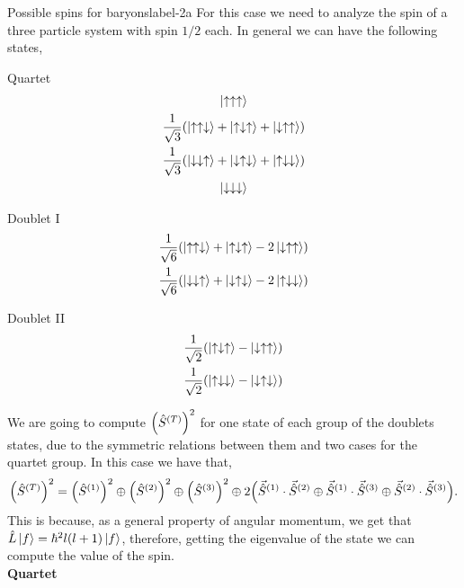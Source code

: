 \documentclass[../main.tex]{subfiles}
\begin{document}
\begin{sol}{Possible spins for baryons}{label-2a}
    For this case we need to analyze the spin of a three particle system with spin $1/2$ each.
    In general we can have the following states,

    \begin{minipage}[c]{0.3\textwidth}
        \centering
        Quartet
    \begin{gather*}
        \ket{\uparrow\uparrow\uparrow} \\
        \frac{1}{\sqrt{3}}\qty(\ket{\uparrow\uparrow\downarrow}+\ket{\uparrow\downarrow\uparrow}+\ket{\downarrow\uparrow\uparrow}) \\
        \frac{1}{\sqrt{3}}\qty(\ket{\downarrow\downarrow\uparrow}+\ket{\downarrow\uparrow\downarrow}+\ket{\uparrow\downarrow\downarrow}) \\
        \ket{\downarrow\downarrow\downarrow}
    \end{gather*}
    \end{minipage}
    \hfill
    \begin{minipage}[c]{0.3\textwidth}
        \centering
        Doublet I
    \begin{gather*}
        \frac{1}{\sqrt{6}}\qty(\ket{\uparrow\uparrow\downarrow}+\ket{\uparrow\downarrow\uparrow}-2\ket{\downarrow\uparrow\uparrow}) \\
        \frac{1}{\sqrt{6}}\qty(\ket{\downarrow\downarrow\uparrow}+\ket{\downarrow\uparrow\downarrow}-2\ket{\uparrow\downarrow\downarrow})
    \end{gather*}
    \end{minipage}
    \hfill
    \begin{minipage}[c]{0.3\textwidth}
        \centering
        Doublet II
    \begin{gather*}
        \frac{1}{\sqrt{2}}\qty(\ket{\uparrow\downarrow\uparrow}-\ket{\downarrow\uparrow\uparrow}) \\
        \frac{1}{\sqrt{2}}\qty(\ket{\uparrow\downarrow\downarrow}-\ket{\downarrow\uparrow\downarrow})
    \end{gather*}
    \end{minipage}

    We are going to compute $\qty(\hat{S}^{(T)})^2$ for one state of each group of the doublets states, due to the symmetric relations between them and two cases for the quartet group.
    In this case we have that,
    \begin{gather*}
        \qty(\hat{S}^{(T)})^2 = \qty(\hat{S}^{(1)})^2 \oplus \qty(\hat{S}^{(2)})^2  \oplus \qty(\hat{S}^{(3)})^2 \oplus 2 \qty(\vec{\hat{S}}^{(1)}\cdot\vec{\hat{S}}^{(2)} \oplus \vec{\hat{S}}^{(1)}\cdot\vec{\hat{S}}^{(3)} \oplus \vec{\hat{S}}^{(2)}\cdot\vec{\hat{S}}^{(3)}).
    \end{gather*}
    This is because, as a general property of angular momentum, we get that $\hat{L}\ket{f}=\hbar^2 l\qty(l+1)\ket{f}$, therefore, getting the eigenvalue of the state we can compute the value of the spin.
\\
    {\bfseries Quartet}\vspace{1.5em}


\end{sol}
\end{document}
